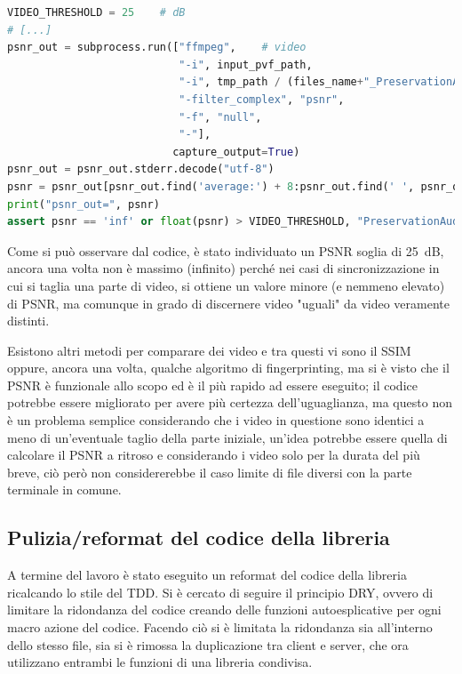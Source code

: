 \begin{lstlisting}[language=Python, caption=Test di comparazione di due file audio tramite il psnr]
VIDEO_THRESHOLD = 25    # dB
# [...]
psnr_out = subprocess.run(["ffmpeg",    # video
                           "-i", input_pvf_path,
                           "-i", tmp_path / (files_name+"_PreservationAudioVisualFile_output_video.mov"),
                           "-filter_complex", "psnr",
                           "-f", "null",
                           "-"],
                          capture_output=True)
psnr_out = psnr_out.stderr.decode("utf-8")
psnr = psnr_out[psnr_out.find('average:') + 8:psnr_out.find(' ', psnr_out.find('average:'))]
print("psnr_out=", psnr)
assert psnr == 'inf' or float(psnr) > VIDEO_THRESHOLD, "PreservationAudioVisualFile.mov is not the same as input"
\end{lstlisting}

Come si può osservare dal codice, è stato individuato un \ac{PSNR} soglia di \qty{25}{\dB}, ancora una volta non è massimo (infinito) perché nei casi di sincronizzazione in cui si taglia una parte di video, si ottiene un valore minore (e nemmeno elevato) di \ac{PSNR}, ma comunque in grado di discernere video "uguali" da video veramente distinti.

Esistono altri metodi per comparare dei video e tra questi vi sono il \ac{SSIM} oppure, ancora una volta, qualche algoritmo di fingerprinting, ma si è visto che il \ac{PSNR} è funzionale allo scopo ed è il più rapido ad essere eseguito; il codice potrebbe essere migliorato per avere più certezza dell'uguaglianza, ma questo non è un problema semplice considerando che i video in questione sono identici a meno di un'eventuale taglio della parte iniziale, un'idea potrebbe essere quella di calcolare il \ac{PSNR} a ritroso e considerando i video solo per la durata del più breve, ciò però non considererebbe il caso limite di file diversi con la parte terminale in comune.


\subsection{Pulizia/reformat del codice della libreria} \label{ssec:packager-post}  %
A termine del lavoro è stato eseguito un reformat del codice della libreria ricalcando lo stile del \ac{TDD}.
Si è cercato di seguire il principio \ac{DRY}, ovvero di limitare la ridondanza del codice creando delle funzioni autoesplicative per ogni macro azione del codice.
Facendo ciò si è limitata la ridondanza sia all'interno dello stesso file, sia si è rimossa la duplicazione tra client e server, che ora utilizzano entrambi le funzioni di una libreria condivisa.

